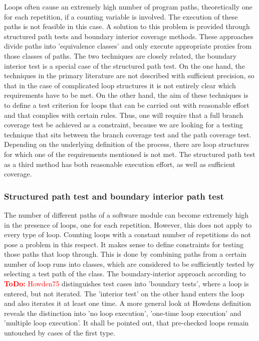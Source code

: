 \documentclass[master,english,smartquotes,apa]{hgbthesis}
\newcommand{\TODO}[1]{\textcolor{red}{\textbf{ToDo:} #1}}
\begin{document}

	Loops often cause an extremely high number of program paths, theoretically one for each repetition, if a counting variable is involved. The execution of these paths is not feasible in this case. A solution to this problem is provided through structured path tests and boundary interior coverage methods. These approaches divide paths into 'equivalence classes' and only execute appropriate proxies from those classes of paths. The two techniques are closely related, the boundary interior test is a special case of the structured path test. On the one hand, the techniques in the primary literature are not described with sufficient precision, so that in the case of complicated loop structures it is not entirely clear which requirements have to be met. On the other hand, the aim of these techniques is to define a test criterion for loops that can be carried out with reasonable effort and that complies with certain rules. Thus, one will require that a full branch coverage test be achieved as a constraint, because we are looking for a testing technique that sits between the branch coverage test and the path coverage test. Depending on the underlying definition of the process, there are loop structures for which one of the requirements mentioned is not met. The structured path test as a third method has both reasonable execution effort, as well as sufficient coverage.


	\subsubsection{Structured path test and boundary interior path test}

	The number of different paths of a software module can become extremely high in the presence of loops, one for each repetition. However, this does not apply to every type of loop. Counting loops with a constant number of repetitions do not pose a problem in this respect. It makes sense to define constraints for testing those paths that loop through. This is done by combining paths from a certain number of loop runs into classes, which are considered to be sufficiently tested by selecting a test path of the class. The boundary-interior approach according to \TODO{Howden75} distinguishes test cases into 'boundary tests', where a loop is entered, but not iterated. The 'interior test' on the other hand enters the loop and also iterates it at least one time. A more general look at Howdens definition reveals the distinction into 'no loop execution', 'one-time loop execution' and 'multiple loop execution'. It shall be pointed out, that pre-checked loops remain untouched by cases of the first type.
\end{document}
